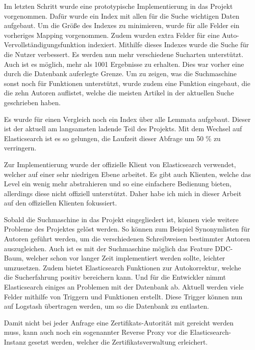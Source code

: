 Im letzten Schritt wurde eine prototypische Implementierung in das Projekt vorgenommen. Dafür wurde ein Index mit allen für die Suche wichtigen Daten aufgebaut. Um die Größe des Indexes zu minimieren, wurde für alle Felder ein vorheriges Mapping vorgenommen. Zudem wurden extra Felder für eine Auto-Vervollständigungsfunktion indexiert. Mithilfe dieses Indexes wurde die Suche für die Nutzer verbessert. Es werden nun mehr verschiedene Sucharten unterstützt. Auch ist es möglich, mehr als 1001 Ergebnisse zu erhalten. Dies war vorher eine durch die Datenbank auferlegte Grenze. Um zu zeigen, was die Suchmaschine sonst noch für Funktionen unterstützt, wurde zudem eine Funktion eingebaut, die die zehn Autoren auflistet, welche die meisten Artikel in der aktuellen Suche geschrieben haben. 

Es wurde für einen Vergleich noch ein Index über alle Lemmata aufgebaut. Dieser ist der aktuell am langsamsten ladende Teil des Projekts. Mit dem Wechsel auf Elasticsearch ist es so gelungen, die Laufzeit dieser Abfrage um 50 \% zu verringern. 

Zur Implementierung wurde der offizielle Klient von Elasticsearch verwendet, welcher auf einer sehr niedrigen Ebene arbeitet. Es gibt auch Klienten, welche das Level ein wenig mehr abstrahieren und so eine einfachere Bedienung bieten, allerdings diese nicht offiziell unterstützt. Daher habe ich mich in dieser Arbeit auf den offiziellen Klienten fokussiert. 

Sobald die Suchmaschine in das Projekt eingegliedert ist, können viele weitere Probleme des Projektes gelöst werden. So können zum Beispiel Synonymlisten für Autoren geführt werden, um die verschiedenen Schreibweisen bestimmter Autoren auszugleichen. Auch ist es mit der Suchmaschine möglich das Feature DDC-Baum, welcher schon vor langer Zeit implementiert werden sollte, leichter umzusetzen. Zudem bietet Elasticsearch Funktionen zur Autokorrektur, welche die Sucherfahrung positiv bereichern kann. Und für die Entwickler nimmt Elasticsearch einiges an Problemen mit der Datenbank ab. Aktuell werden viele Felder mithilfe von Triggern und Funktionen erstellt. Diese Trigger können nun auf Logstash übertragen werden, um so die Datenbank zu entlasten.

Damit nicht bei jeder Anfrage eine Zertifikats-Autorität mit gereicht werden muss, kann auch noch ein sogenannter Reverse Proxy vor die Elasticsearch-Instanz gesetzt werden, welcher die Zertifikatsverwaltung erleichert.
